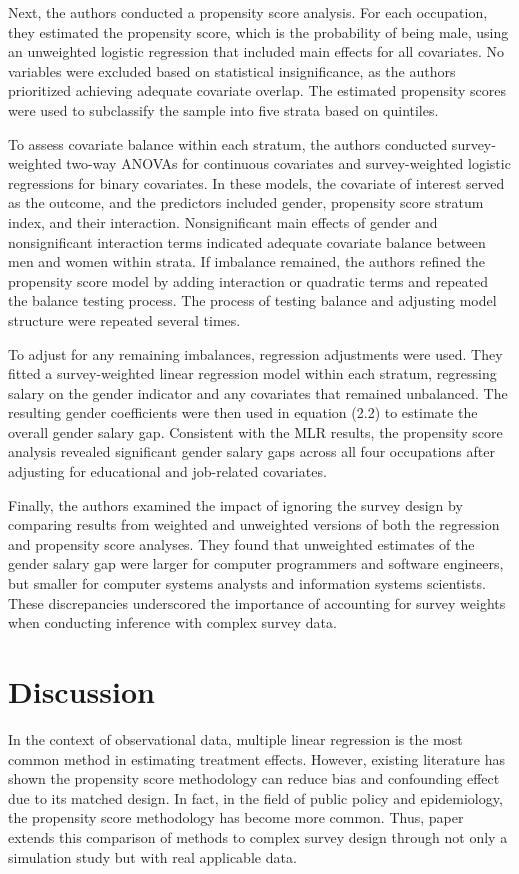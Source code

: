 \documentclass[12pt]{article}
\begin{document}
Next, the authors conducted a propensity score analysis. For each occupation, they estimated the propensity score, which is the probability of being male, using an unweighted logistic regression that included main effects for all covariates. No variables were excluded based on statistical insignificance, as the authors prioritized achieving adequate covariate overlap. The estimated propensity scores were used to subclassify the sample into five strata based on quintiles.

To assess covariate balance within each stratum, the authors conducted survey-weighted two-way ANOVAs for continuous covariates and survey-weighted logistic regressions for binary covariates. In these models, the covariate of interest served as the outcome, and the predictors included gender, propensity score stratum index, and their interaction. Nonsignificant main effects of gender and nonsignificant interaction terms indicated adequate covariate balance between men and women within strata. If imbalance remained, the authors refined the propensity score model by adding interaction or quadratic terms and repeated the balance testing process. The process of testing balance and adjusting model structure were repeated several times. 

To adjust for any remaining imbalances, regression adjustments were used. They fitted a survey-weighted linear regression model within each stratum, regressing salary on the gender indicator and any covariates that remained unbalanced. The resulting gender coefficients were then used in equation (2.2) to estimate the overall gender salary gap. Consistent with the MLR results, the propensity score analysis revealed significant gender salary gaps across all four occupations after adjusting for educational and job-related covariates.

Finally, the authors examined the impact of ignoring the survey design by comparing results from weighted and unweighted versions of both the regression and propensity score analyses. They found that unweighted estimates of the gender salary gap were larger for computer programmers and software engineers, but smaller for computer systems analysts and information systems scientists. These discrepancies underscored the importance of accounting for survey weights when conducting inference with complex survey data.


\section{Discussion}
In the context of observational data, multiple linear regression is the most common method in estimating treatment effects. However, existing literature has shown the propensity score methodology can reduce bias and confounding effect due to its matched design. In fact, in the field of public policy and epidemiology, the propensity score methodology has become more common. Thus, paper extends this comparison of methods to complex survey design through not only a simulation study but with real applicable data. 
\end{document}
